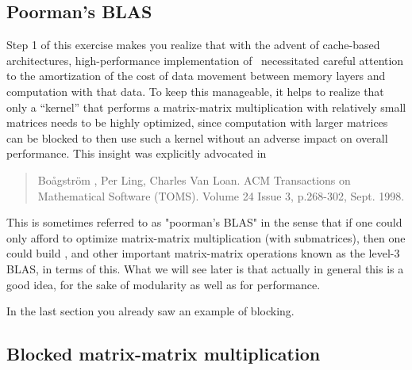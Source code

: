 \subsection{Poorman's BLAS}

Step 1 of this exercise makes you realize that
with the advent of cache-based architectures, high-performance implementation of \Gemm\ necessitated careful attention to 
the amortization of the cost of data movement between memory layers and computation with that data.
To keep this manageable, it helps to realize that only a ``kernel'' that performs a  matrix-matrix multiplication with relatively small matrices needs to be highly optimized, since
computation with larger matrices can be blocked to then use such a kernel without an adverse impact on overall performance.  This 
insight was explicitly advocated in~\cite{poorman_journal}
\begin{quote}
	Bo{\aa}gstr\"{o}m , Per Ling, Charles Van Loan.
	ACM Transactions on Mathematical Software (TOMS). 
	Volume 24 Issue 3, p.268-302, Sept. 1998.
\end{quote}
This is sometimes referred to as "poorman's BLAS" in the sense that if one could only afford to optimize matrix-matrix multiplication (with submatrices), then one could build \Gemm, and other important matrix-matrix operations known as the level-3 BLAS, in terms of this.  What we will see later is that actually in general this is a good idea, for the sake of modularity as well as for performance.

In the last section you already saw an example of blocking.  

\subsection{Blocked matrix-matrix multiplication}

